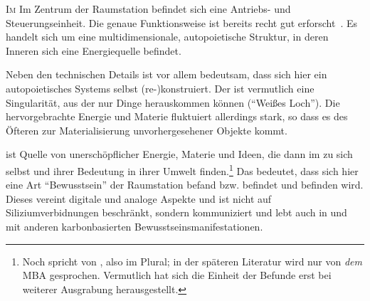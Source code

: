 \begin{newstuff}
    \lettrine{I}{m}
    Im Zentrum der Raumstation befindet sich eine Antriebs- und Steuerungseinheit. Die genaue Funktionsweise ist bereits recht gut erforscht~\cite[S.~31ff]{cbasebook}. Es handelt  sich um eine multidimensionale, autopoietische Struktur, in deren Inneren sich eine Energiequelle befindet.


    Neben den technischen Details ist vor allem bedeutsam, dass sich hier ein autopoietisches Systems selbst (re-)konstruiert. 
    Der  ist vermutlich eine Singularität, aus der nur Dinge herauskommen können ("`Weißes Loch"'). Die hervorgebrachte Energie und Materie fluktuiert allerdings stark, so dass es des Öfteren zur Materialisierung unvorhergesehener Objekte kommt.


     ist Quelle von unerschöpflicher Energie, Materie und Ideen, die dann im  zu sich selbst und ihrer Bedeutung in ihrer Umwelt finden.\footnote{Noch \cite{cbasestarbasemanual} spricht von , also im Plural; in der späteren Literatur wird nur von \emph{dem} MBA gesprochen. Vermutlich  hat sich die Einheit der Befunde erst bei weiterer Ausgrabung herausgestellt.} 
    Das bedeutet, dass sich hier eine Art "`Bewusstsein"' der Raumstation befand bzw. befindet und befinden wird. 
    Dieses vereint digitale und analoge Aspekte und ist nicht auf Siliziumverbidnungen beschränkt, sondern kommuniziert und lebt auch in und mit anderen karbonbasierten Bewusstseinsmanifestationen. 

    


\end{newstuff}
